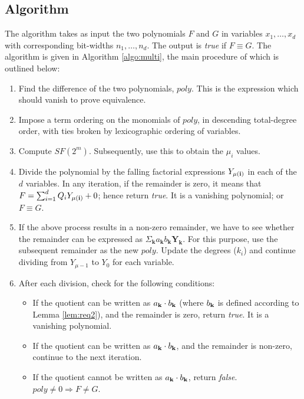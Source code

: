 \subsection{Algorithm}


The algorithm takes as input the two polynomials $F$ and $G$ in
variables $x_1, \ldots, x_d$ with corresponding bit-widths $n_1,
\ldots, n_d$. The output is {\it true} if $F \equiv G$. The algorithm
is given in Algorithm \ref{algo:multi}, the main procedure of which is
outlined below:
\begin{enumerate}
\item Find the difference of the two polynomials, $poly$. This is the
  expression which should vanish to prove equivalence. 

\item Impose a term ordering on the  monomials of $poly$, in
  descending total-degree order, with ties broken by lexicographic
  ordering of variables.  

\item Compute $SF(2^m)$. %
    Subsequently, use this to obtain the $\mu_i$ values.  


\item Divide the polynomial by the falling factorial expressions
  $Y_{\bf \mu(i)}$ in each of the $d$ variables. %
In any iteration, if the remainder is zero, it means that $F = \sum
  _{i=1}^d Q_i Y_{\bf \mu(i)} + 0$; hence return {\it true}. It is a
  vanishing polynomial; or $F \equiv G$. 

\item If the above process results in a non-zero remainder, we have to
  see whether the remainder can be expressed as 
$\Sigma_{\textbf{k}}a_\textbf{k}b_\textbf{k}\textbf{Y}_\textbf{k}$.
  For this purpose, use the subsequent remainder as the new $poly$. Update the
  degrees ($k_i$) and continue dividing from $Y_{\mu-1}$ to $Y_0$ for each
  variable. 
\item After each division, check for the following conditions:
\begin{itemize}
\item If the quotient can be written as $a_{\bf k}\cdot b_{\bf k}$ (where $b_{\bf k}$ is defined according to Lemma \ref{lem:req2}), and the remainder is zero, return {\it true}. It is a vanishing polynomial.
\item If the quotient can be written as $a_{\bf k}\cdot b_{\bf k}$, and the remainder is non-zero, continue to the next iteration.
\item If the quotient cannot be written as $a_{\bf k}\cdot b_{\bf k}$, return {\it false}. $poly \neq 0 \Rightarrow F \neq G$.
\end{itemize}
\end{enumerate}

